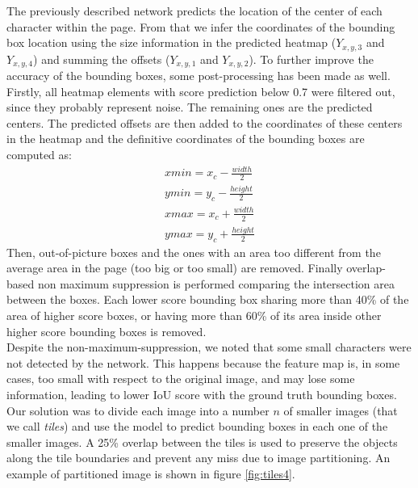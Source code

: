 The previously described network predicts the location of the center of each character within the page. From that we infer the coordinates of the bounding box location using the size information in the predicted heatmap ($Y_{x,y,3}$ and $Y_{x,y,4}$) and summing the offsets ($Y_{x,y,1}$ and $Y_{x,y,2}$). To further improve the accuracy of the bounding boxes, some post-processing has been made as well. Firstly, all heatmap elements with score prediction below 0.7 were filtered out, since they probably represent noise. The remaining ones are the predicted centers. The predicted offsets are then added to the coordinates of these centers in the heatmap and the definitive coordinates of the bounding boxes are computed as:
\begin{eqnarray*}
	xmin=x_c - \frac{width}{2}\\
	ymin= y_c - \frac{height}{2}\\
	xmax=x_c + \frac{width}{2}\\
	ymax=y_c + \frac{height}{2}
\end{eqnarray*}
Then, out-of-picture boxes and the ones with an area too different from the average area in the page (too big or too small) are removed. Finally overlap-based non maximum suppression is performed comparing the intersection area between the boxes. Each lower score bounding box sharing more than 40\% of the area of higher score boxes, or having more than 60\% of its area inside other higher score bounding boxes is removed.\\

\noindent Despite the non-maximum-suppression, we noted that some small characters were not detected by the network. This happens because the feature map is, in some cases, too small with respect to the original image, and may lose some information, leading to lower IoU score with the ground truth bounding boxes. 
Our solution was to divide each image into a number $n$ of smaller images (that we call \textit{tiles}) and use the model to predict bounding boxes in each one of the smaller images. A 25\% overlap between the tiles is used to preserve the objects along the tile boundaries and prevent any miss due to image partitioning. An example of partitioned image is shown in figure \ref{fig:tiles4}.

\iffalse
\begin{figure}
	\centering
	\texttt{[image: detection/tiles\_4.png]}
	\caption{An image divided in 4 tiles with 25\% overlapping}
	\label{fig:tiles4}
\end{figure}
\fi

